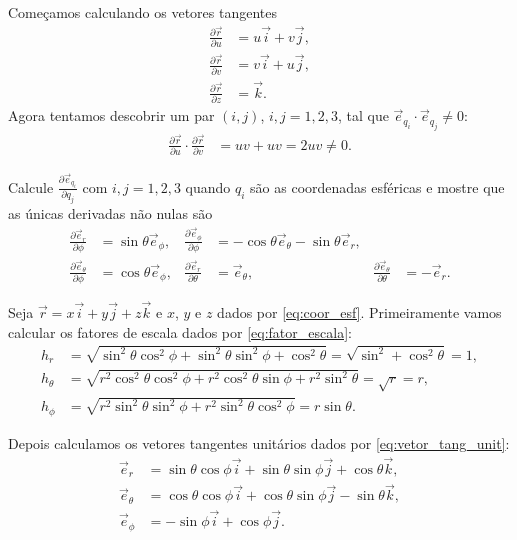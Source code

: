 \documentclass[a4paper,12pt, leqno, answers]{exam}
\newcommand{\devp}[2]{\frac{\partial #1}{\partial #2}}
\begin{document}
\begin{questions}
\begin{solution}
        Come\c{c}amos calculando os vetores tangentes
        \begin{align*}
            \devp{\vec{r}}{u} &= u \vec{i} + v \vec{j}, \\
            \devp{\vec{r}}{v} &= v \vec{i} + u \vec{j}, \\
            \devp{\vec{r}}{z} &= \vec{k}.
        \end{align*}
        Agora tentamos descobrir um par $(i,j)$, $i, j = 1, 2, 3$, tal que $\vec{e}_{q_i} \cdot \vec{e}_{q_j} \neq 0$:
        \begin{align*}
            \devp{\vec{r}}{u} \cdot \devp{\vec{r}}{v} &= u v + u v = 2 uv \neq 0.
        \end{align*}
    \end{solution}
  
    \question Calcule $\devp{\vec{e}_{q_i}}{q_j}$ com $i, j = 1, 2, 3$ quando $q_i$ s\~{a}o as coordenadas esf\'{e}ricas e mostre que as únicas derivadas n\~{a}o nulas s\~{a}o
    \begin{align*}
        \devp{\vec{e}_r}{\phi} &= \sin \theta \vec{e}_\phi, &
        \devp{\vec{e}_\phi}{\phi} &= -\cos \theta \vec{e}_\theta - \sin \theta \vec{e}_r, \\
        \devp{\vec{e}_\theta}{\phi} &= \cos \theta \vec{e}_\phi, &
        \devp{\vec{e}_r}{\theta} &= \vec{e}_\theta, &
        \devp{\vec{e}_\theta}{\theta} &= -\vec{e}_r.
    \end{align*}
    \begin{solution}
        Seja $\vec{r} = x \vec{i} + y \vec{j} + z \vec{k}$ e $x$, $y$ e $z$ dados por \eqref{eq:coor_esf}. Primeiramente vamos calcular os fatores de escala dados por \eqref{eq:fator_escala}:
        \begin{align*}
            h_r &= \sqrt{\sin^2 \theta \cos^2 \phi + \sin^2 \theta \sin^2 \phi + \cos^2 \theta} = \sqrt{\sin^2  + \cos^2 \theta} = 1, \\
            h_\theta &= \sqrt{r^2 \cos^2 \theta \cos^2 \phi + r^2 \cos^2 \theta \sin \phi + r^2 \sin^2 \theta} = \sqrt{r} = r, \\
            h_\phi &= \sqrt{r^2 \sin^2 \theta \sin^2 \phi + r^2 \sin^2 \theta \cos^2 \phi} = r \sin \theta.
        \end{align*}
  
        Depois calculamos os vetores tangentes unit\'{a}rios dados por \eqref{eq:vetor_tang_unit}:
        \begin{align*}
            \vec{e}_r &= \sin \theta \cos \phi \vec{i} + \sin \theta \sin \phi \vec{j} + \cos \theta \vec{k}, \\
            \vec{e}_\theta &= \cos \theta \cos \phi \vec{i} + \cos \theta \sin \phi \vec{j} - \sin \theta \vec{k}, \\
            \vec{e}_\phi &= - \sin \phi \vec{i} + \cos \phi \vec{j}.
        \end{align*}
  

\end{solution}
\end{questions}
\end{document}

